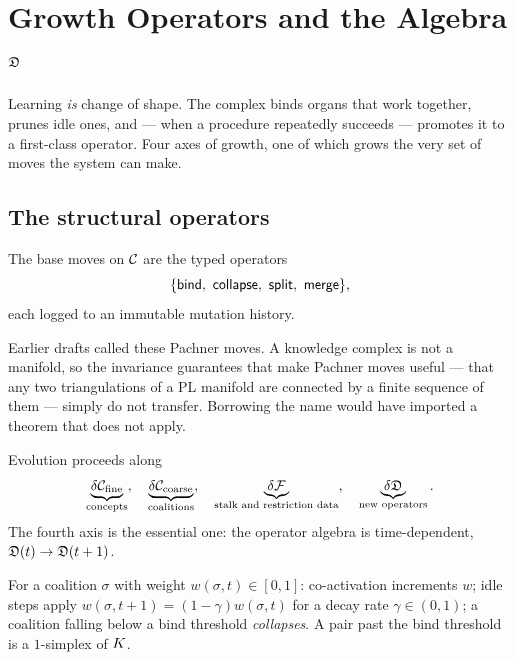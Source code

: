 \chapter{Growth Operators and the Algebra $\mathfrak{D}$}\label{ch:growth}

\begin{intu}\Intu
Learning \emph{is} change of shape. The complex binds organs that work
together, prunes idle ones, and --- when a procedure repeatedly succeeds
--- promotes it to a first-class operator. Four axes of growth, one of
which grows the very set of moves the system can make.
\end{intu}

\section{The structural operators}

\begin{definition}\label{def:ops}
The base moves on $\mathcal{C}$ are the typed operators
\[
  \{\opbind,\ \opcollapse,\ \opsplit,\ \opmerge\},
\]
each logged to an immutable mutation history.
\end{definition}

\begin{remark}
Earlier drafts called these Pachner moves. A knowledge complex is not a
manifold, so the invariance guarantees that make Pachner moves useful
--- that any two triangulations of a PL manifold are connected by a
finite sequence of them --- simply do not transfer. Borrowing the name
would have imported a theorem that does not apply.
\end{remark}

\begin{construction}\label{con:axes}
Evolution proceeds along
\[
  \underbrace{\delta\mathcal{C}_{\text{fine}}}_{\text{concepts}},\quad
  \underbrace{\delta\mathcal{C}_{\text{coarse}}}_{\text{coalitions}},\quad
  \underbrace{\delta\mathcal{F}}_{\text{stalk and restriction data}},\quad
  \underbrace{\delta\mathfrak{D}}_{\text{new operators}} .
\]
The fourth axis is the essential one: the operator algebra is
time-dependent, $\mathfrak{D}(t)\to\mathfrak{D}(t+1)$.
\end{construction}

\begin{definition}\label{def:hebb}
For a coalition $\sigma$ with weight $w(\sigma,t)\in[0,1]$:
co-activation increments $w$; idle steps apply
$w(\sigma,t+1)=(1-\gamma)w(\sigma,t)$ for a decay rate $\gamma\in(0,1)$;
a coalition falling below a bind threshold \emph{collapses}. A pair past
the bind threshold is a $1$-simplex of $K$.
\end{definition}

